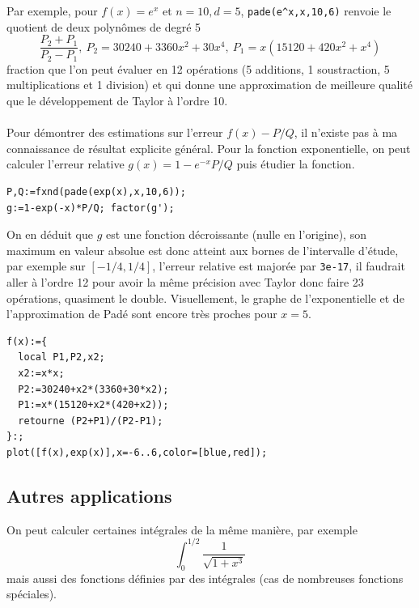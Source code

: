 \documentclass[a4paper,11pt]{article}
\begin{document}
\begin{giacjshere}
Par exemple, pour $f(x)=e^x$ et $n=10, d=5$, \verb|pade(e^x,x,10,6)|
renvoie le quotient de deux polyn\^omes de degré 5
$$ \frac{P_2+P_1}{P_2-P_1}, \ P_2=30240+3360x^2+30x^4,\ P_1=x(15120+420x^2+x^4)$$
fraction que l'on peut évaluer en 12 op\'erations (5 additions, 1
soustraction, 5 multiplications et 1 division)
et qui donne une approximation de meilleure qualité que le
développement de Taylor à l'ordre 10.\\
\\
Pour d\'emontrer des estimations sur l'erreur $f(x)-P/Q$, il n'existe
pas \`a ma connaissance de r\'esultat explicite g\'en\'eral. 
Pour la fonction exponentielle, on peut calculer l'erreur relative
$g(x)=1-e^{-x}P/Q$
puis \'etudier la fonction.
\begin{verbatim}
P,Q:=fxnd(pade(exp(x),x,10,6));
g:=1-exp(-x)*P/Q; factor(g');
\end{verbatim}
On en d\'eduit que $g$ est une fonction d\'ecroissante
(nulle en l'origine), son maximum en valeur absolue
est donc atteint aux bornes de l'intervalle d'\'etude, par
exemple sur $[-1/4,1/4]$, l'erreur relative est major\'ee
par \verb|3e-17|, il faudrait aller \`a l'ordre 12 pour
avoir la m\^eme pr\'ecision avec Taylor donc faire 23 op\'erations,
quasiment le double. Visuellement, le graphe de l'exponentielle et de
l'approximation de Pad\'e sont encore tr\`es proches pour $x=5$.
\begin{verbatim}
f(x):={
  local P1,P2,x2;
  x2:=x*x;
  P2:=30240+x2*(3360+30*x2);
  P1:=x*(15120+x2*(420+x2));
  retourne (P2+P1)/(P2-P1);
}:;
plot([f(x),exp(x)],x=-6..6,color=[blue,red]);
\end{verbatim}

\subsection{Autres applications}
On peut calculer certaines int\'egrales de la m\^eme mani\`ere,
par exemple
\[ \int _0^{1/2} \frac{1}{\sqrt{1+x^3}}\]
mais aussi des fonctions définies par des intégrales (cas de nombreuses
fonctions spéciales).


\end{giacjshere}
\end{document}
